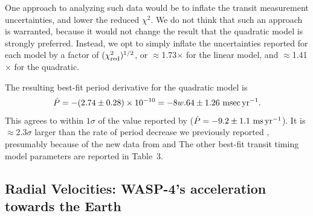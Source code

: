 \documentclass[12pt,twocolumn,tighten]{aastex62}
\begin{document}
One approach to analyzing such data would be to inflate the transit
measurement uncertainties, and lower the reduced $\chi^2$.  We do not
think that such an approach is warranted, because it would not change
the result that the quadratic model is strongly preferred.  Instead,
we opt to simply inflate the uncertainties reported for each model by
a factor of $(\chi^2_{\rm red})^{1/2}$, or $\approx$1.73$\times$ for the
linear model, and $\approx$1.41$\times$ for the quadratic.

The resulting best-fit period derivative for the quadratic model is 
\begin{equation}
\dot{P}
  = - (2.74 \pm 0.28)\times 10^{-10}
  = - 8w.64 \pm 1.26~{\rm msec}\,{\rm yr}^{-1}.
  \label{eq:dP_dt_obs}
\end{equation}
This agrees to within $1\sigma$ of the value reported by
\citet{southworth_transit_2019} ($\dot{P} = - 9.2 \pm 1.1~{\rm
ms}\,{\rm yr}^{-1}$).  It is $\approx$2.3$\sigma$ larger than the rate
of period decrease we previously reported , presumably because of the
new data from \citeauthor{southworth_transit_2019} and
\citeauthor{baluev_2019}  The other best-fit transit timing model
parameters are reported in Table~3.



\subsection{Radial Velocities: WASP-4's acceleration towards the Earth}
\end{document}

